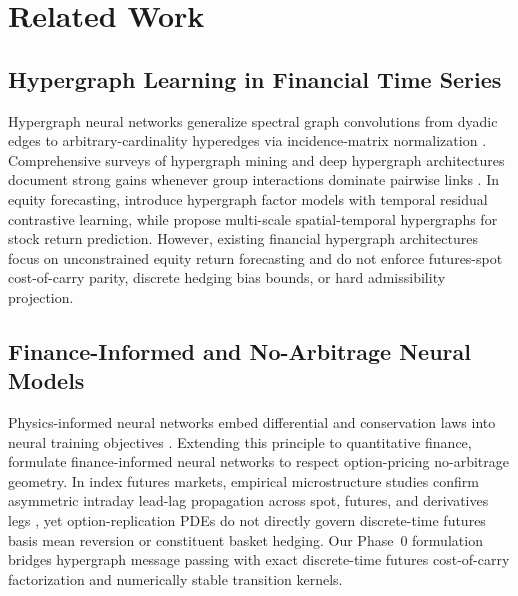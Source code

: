 \section{Related Work}
\label{sec:related}

\subsection{Hypergraph Learning in Financial Time Series}
\label{sec:rw_hypergraph}

Hypergraph neural networks generalize spectral graph convolutions from dyadic edges to arbitrary-cardinality hyperedges via incidence-matrix normalization \citep{feng2019hypergraph,Kim2024HNNSurvey}. Comprehensive surveys of hypergraph mining and deep hypergraph architectures document strong gains whenever group interactions dominate pairwise links \citep{Lee2025HypergraphMining}. In equity forecasting, \citet{Duan2025FactorGCL} introduce hypergraph factor models with temporal residual contrastive learning, while \citet{Qiu2025Hermes} propose multi-scale spatial-temporal hypergraphs for stock return prediction. However, existing financial hypergraph architectures focus on unconstrained equity return forecasting and do not enforce futures-spot cost-of-carry parity, discrete hedging bias bounds, or hard admissibility projection.

\subsection{Finance-Informed and No-Arbitrage Neural Models}
\label{sec:rw_finn}

Physics-informed neural networks embed differential and conservation laws into neural training objectives \citep{raissi2019physics}. Extending this principle to quantitative finance, \citet{Aboussalah2024FINN} formulate finance-informed neural networks to respect option-pricing no-arbitrage geometry. In index futures markets, empirical microstructure studies confirm asymmetric intraday lead-lag propagation across spot, futures, and derivatives legs \citep{MultiMarketLeadLag2023}, yet option-replication PDEs do not directly govern discrete-time futures basis mean reversion or constituent basket hedging. Our Phase~0 formulation bridges hypergraph message passing with exact discrete-time futures cost-of-carry factorization and numerically stable transition kernels.
